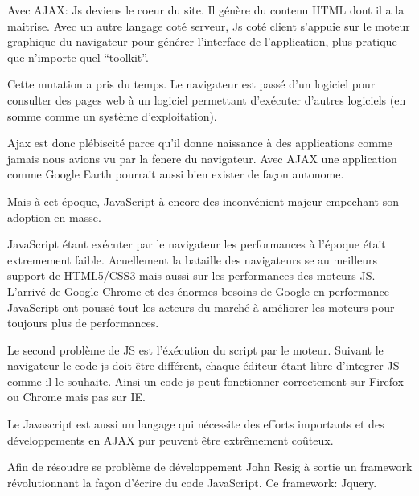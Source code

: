 Avec AJAX: Js deviens le coeur du site. Il génère du contenu HTML dont il a la maitrise. Avec un autre langage coté serveur, Js coté client s’appuie sur le moteur graphique du navigateur pour générer l’interface de l’application, plus pratique que n’importe quel “toolkit”.

Cette mutation a pris du temps. Le navigateur est passé d’un logiciel pour consulter des pages web à un logiciel permettant d’exécuter d’autres logiciels (en somme comme un système d’exploitation).

Ajax est donc plébiscité parce qu’il donne naissance à des applications comme jamais nous avions vu par la fenere du navigateur. Avec AJAX une application comme Google Earth pourrait aussi bien exister de façon autonome.

Mais à cet époque, JavaScript à encore des inconvénient majeur empechant son adoption en masse.

JavaScript étant exécuter par le navigateur les performances à l’époque était extremement faible. Acuellement la bataille des navigateurs se au meilleurs support de HTML5/CSS3 mais aussi sur les performances des moteurs JS. L’arrivé de Google Chrome et des énormes besoins de Google en performance JavaScript ont poussé tout les acteurs du marché à améliorer les moteurs pour toujours plus de performances.

Le second problème de JS est l’éxécution du script par le moteur. Suivant le navigateur le code js doit être différent, chaque éditeur étant libre d’integrer JS comme il le souhaite. Ainsi un code js peut fonctionner correctement sur Firefox ou Chrome mais pas sur IE.

Le Javascript est aussi un langage qui nécessite des efforts importants et des développements en AJAX pur peuvent être extrêmement coûteux.

Afin de résoudre se problème de développement  John Resig à sortie un framework révolutionnant la façon d’écrire du code JavaScript. Ce framework: Jquery.

